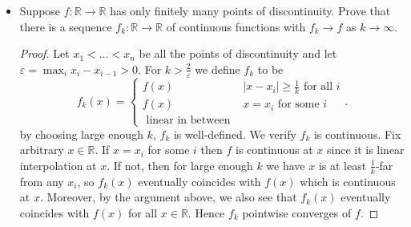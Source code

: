 \begin{itemize}
\begin{proof}
Fix $h \in I$. For each $a_i \in A$, let $f(a_i) \in A$ be such that $\rho\left( h(a_i) , f(a_i) \right) < \varepsilon$. We know $f \in X$ exists by total-boundedness of $M$. Fix arbitrary $x \in M$, then there exists  $a_i$ such that $\rho(x, a_i) < \varepsilon$. 

By property of isometry, $\rho\left( h(x), h(a_i) \right) <\varepsilon$ and $\rho\left( g_f(x), g_f(a_i) \right) <\varepsilon$. By definition of $g_f$, $\rho\left(g_f(a_i), f(a_i)\right)<\varepsilon$.
Now by triangle inequality
\begin{align*}
	\rho\left(g_f(x), h(x)\right) &\le \rho\left( g_f(x), g_f(a_i) \right) + \rho\left( g_f(a_i) , f(a_i) \right) \\
				      &\qquad +\rho\left( f(a_i), h(a_i) \right) +\rho\left(h(a_i), h(x)\right) \\
				      &< 4 \varepsilon
.\end{align*} 

This is true for all $x$, so $\tau(g_f, h) \le 4 \varepsilon$. This implies total boundedness since the collections of balls centered at $\{g_f: f \in X\} $ with radius $4 \varepsilon$ would cover $I$. 

Finally we show completeness. Consider some Cauchy sequence $f_n \in I$.  Since $M$ compact, $M$ is complete, so $\text{Map}(M, M)$ is complete. Hence $f_n$ uniformly converges to some $f \in \text{Map}(M, M)$. It remains to show $f$ is an isometry. 
\[
	\rho(f(x), f(y)) = \rho(\lim f_n(x), \lim f_n(y)) = \lim \rho(f_n(x), f_n(y)) = \lim \rho(x,y) = \rho(x,y)
.\] 

We could exchange the limit with $\rho$ because $\rho$ is continuous.
\end{proof}
\item Suppose $f: \mathbb{R}\to \mathbb{R}$ has only finitely many points of discontinuity. Prove that there is a sequence $f_k: \mathbb{R}\to \mathbb{R}$ of continuous functions with $f_k \to f$ as $k \to \infty $.
\begin{proof}
	Let $x_1<  \ldots < x_n $ be all the points of discontinuity and let $\varepsilon = \max_i x_i - x_{i-1} > 0$. For $k > \frac{2}{\varepsilon}$ we define $f_k$ to be
	\[
		f_k(x) = \begin{cases}
			f(x) & |x-x_i| \ge  \frac{1}{k} \text{ for all $i$}\\
			f(x) & x = x_i \text{ for some $i$} \\
			\text{ linear in between }
		\end{cases}
	.\] 
	by choosing large enough $k$, $f_ k$ is well-defined. We verify $f_k$ is continuous. Fix arbitrary $x \in \mathbb{R}$. If $x = x_i$ for some $i$ then $f$ is continuous at $x$ since it is linear interpolation at $x$. If not, then for large enough $k$ we have $x$ is at least $\frac{1}{k}$-far from any $x_i$, so $f_k(x)$ eventually coincides with $f(x)$ which is continuous at $x$. Moreover, by the argument above, we also see that $f_k(x)$ eventually coincides with $f(x)$ for all $x \in \mathbb{R}$. Hence $f_k$ pointwise converges of $f$.
\end{proof}

\end{itemize}
